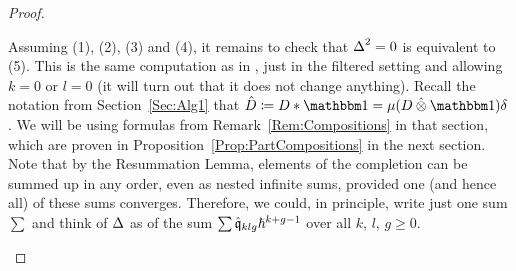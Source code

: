 \documentclass[\MainFolder/Text.tex]{subfiles}
\begin{document}
\begin{proof}
\begin{ProofList}
Assuming (1), (2), (3) and (4), it remains to check that $\operatorname{\Delta}^2 = 0$ is equivalent to (5). This is the same computation as in \cite[Section~2]{Cieliebak2015}, just in the filtered setting and allowing $k=0$ or $l=0$ (it will turn out that it does not change anything). Recall the notation from Section~\ref{Sec:Alg1} that $\hat{D} \coloneqq D \Star \Id = \mu(D\COtimes \Id)\delta$. We will be using formulas from Remark~\ref{Rem:Compositions} in that section, which are proven in Proposition~\ref{Prop:PartCompositions} in the next section. Note that by the Resummation Lemma, elements of the completion can be summed up in any order, even as nested infinite sums, provided one (and hence all) of these sums converges. Therefore, we could, in principle, write just one sum $\sum$ and think of $\operatorname{\Delta}$ as of the sum $\sum \hat{\mathfrak{q}}_{klg} \hbar^{k+g-1}$ over all $k$, $l$, $g\ge 0$.


\end{ProofList}
\end{proof}
\end{document}
